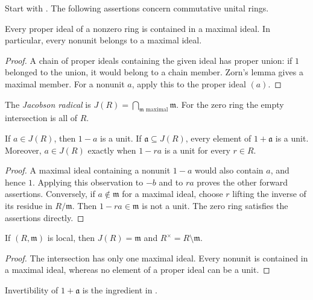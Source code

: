 Start with .
The following assertions concern commutative unital rings.

\begin{lemma}\label{maximal-ideal-existence}
Every proper ideal of a nonzero ring is contained in a maximal ideal.
In particular, every nonunit belongs to a maximal ideal.
\end{lemma}
\begin{proof}\label{maximal-ideal-existence-proof}
A chain of proper ideals containing the given ideal has proper union:
if $1$ belonged to the union, it would belong to a chain member.
Zorn's lemma gives a maximal member. For a nonunit $a$, apply this to
the proper ideal $(a)$.
\end{proof}
\begin{definition}\label{jacobson-radical}
The \emph{Jacobson radical} is
$J(R)=\bigcap_{\mathfrak m\text{ maximal}}\mathfrak m$.
For the zero ring the empty intersection is all of $R$.
\end{definition}
\begin{proposition}\label{jacobson-units}
If $a\in J(R)$, then $1-a$ is a unit. If $\mathfrak a\subseteq J(R)$,
every element of $1+\mathfrak a$ is a unit. Moreover,
$a\in J(R)$ exactly when $1-ra$ is a unit for every $r\in R$.
\end{proposition}
\begin{proof}\label{jacobson-units-proof}
A maximal ideal containing a nonunit $1-a$ would also contain $a$,
and hence $1$. Applying this observation to $-b$ and to $ra$ proves
the other forward assertions. Conversely, if $a\notin\mathfrak m$
for a maximal ideal, choose $r$ lifting the inverse of its residue
in $R/\mathfrak m$. Then $1-ra\in\mathfrak m$ is not a unit.
The zero ring satisfies the assertions directly.
\end{proof}
\begin{corollary}\label{local-jacobson}
If $(R,\mathfrak m)$ is local, then $J(R)=\mathfrak m$ and
$R^\times=R\setminus\mathfrak m$.
\end{corollary}
\begin{proof}\label{local-jacobson-proof}
The intersection has only one maximal ideal. Every nonunit is contained
in a maximal ideal, whereas no element of a proper ideal can be a unit.
\end{proof}
\begin{remark}\label{jacobson-nakayama-link}
Invertibility of $1+\mathfrak a$ is the ingredient in
.
\end{remark}
